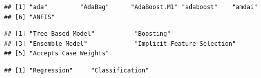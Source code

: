 \documentclass[
]{book}
\newenvironment{Shaded}{\begin{snugshade}}{\end{snugshade}}
\newcommand{\CommentTok}[1]{\textcolor[rgb]{0.56,0.35,0.01}{\textit{#1}}}
\newcommand{\FunctionTok}[1]{\textcolor[rgb]{0.00,0.00,0.00}{#1}}
\newcommand{\NormalTok}[1]{#1}
\newcommand{\SpecialCharTok}[1]{\textcolor[rgb]{0.00,0.00,0.00}{#1}}
\begin{document}
\begin{verbatim}
## [1] "ada"         "AdaBag"      "AdaBoost.M1" "adaboost"    "amdai"      
## [6] "ANFIS"
\end{verbatim}

\begin{Shaded}
\end{Shaded}

\begin{verbatim}
## [1] "Tree-Based Model"           "Boosting"                  
## [3] "Ensemble Model"             "Implicit Feature Selection"
## [5] "Accepts Case Weights"
\end{verbatim}

\begin{Shaded}
\end{Shaded}

\begin{verbatim}
## [1] "Regression"     "Classification"
\end{verbatim}
\end{document}
